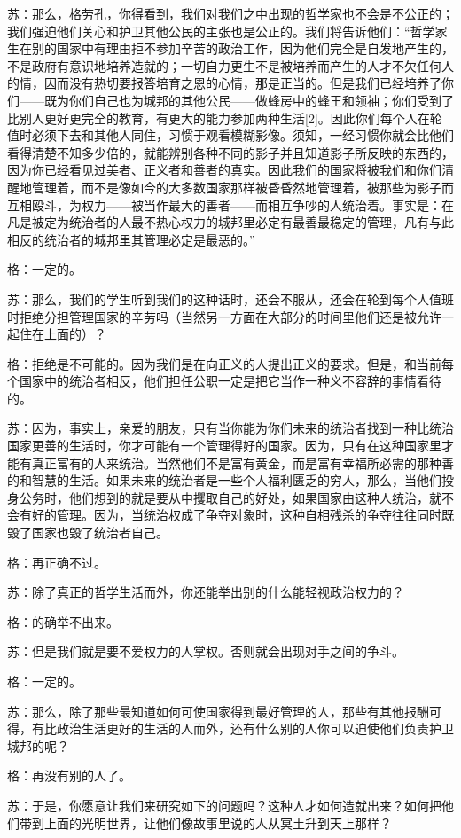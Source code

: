 \documentclass[12pt,oneside]{book}
\begin{document}
苏：那么，格劳孔，你得看到，我们对我们之中出现的哲学家也不会是不公正的；我们强迫他们关心和护卫其他公民的主张也是公正的。我们将告诉他们：“哲学家生在别的国家中有理由拒不参加辛苦的政治工作，因为他们完全是自发地产生的，不是政府有意识地培养造就的；一切自力更生不是被培养而产生的人才不欠任何人的情，因而没有热切要报答培育之恩的心情，那是正当的。但是我们已经培养了你们——既为你们自己也为城邦的其他公民——做蜂房中的蜂王和领袖；你们受到了比别人更好更完全的教育，有更大的能力参加两种生活[2]。因此你们每个人在轮值时必须下去和其他人同住，习惯于观看模糊影像。须知，一经习惯你就会比他们看得清楚不知多少倍的，就能辨别各种不同的影子并且知道影子所反映的东西的，因为你已经看见过美者、正义者和善者的真实。因此我们的国家将被我们和你们清醒地管理着，而不是像如今的大多数国家那样被昏昏然地管理着，被那些为影子而互相殴斗，为权力——被当作最大的善者——而相互争吵的人统治着。事实是：在凡是被定为统治者的人最不热心权力的城邦里必定有最善最稳定的管理，凡有与此相反的统治者的城邦里其管理必定是最恶的。”

格：一定的。

苏：那么，我们的学生听到我们的这种话时，还会不服从，还会在轮到每个人值班时拒绝分担管理国家的辛劳吗（当然另一方面在大部分的时间里他们还是被允许一起住在上面的）？

格：拒绝是不可能的。因为我们是在向正义的人提出正义的要求。但是，和当前每个国家中的统治者相反，他们担任公职一定是把它当作一种义不容辞的事情看待的。

苏：因为，事实上，亲爱的朋友，只有当你能为你们未来的统治者找到一种比统治国家更善的生活时，你才可能有一个管理得好的国家。因为，只有在这种国家里才能有真正富有的人来统治。当然他们不是富有黄金，而是富有幸福所必需的那种善的和智慧的生活。如果未来的统治者是一些个人福利匮乏的穷人，那么，当他们投身公务时，他们想到的就是要从中攫取自己的好处，如果国家由这种人统治，就不会有好的管理。因为，当统治权成了争夺对象时，这种自相残杀的争夺往往同时既毁了国家也毁了统治者自己。

格：再正确不过。

苏：除了真正的哲学生活而外，你还能举出别的什么能轻视政治权力的？

格：的确举不出来。

苏：但是我们就是要不爱权力的人掌权。否则就会出现对手之间的争斗。

格：一定的。

苏：那么，除了那些最知道如何可使国家得到最好管理的人，那些有其他报酬可得，有比政治生活更好的生活的人而外，还有什么别的人你可以迫使他们负责护卫城邦的呢？

格：再没有别的人了。

苏：于是，你愿意让我们来研究如下的问题吗？这种人才如何造就出来？如何把他们带到上面的光明世界，让他们像故事里说的人从冥土升到天上那样？
\end{document}
